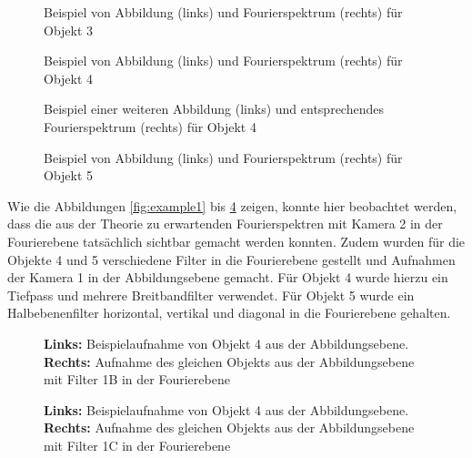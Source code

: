 \begin{figure}
	\centering
	\caption{Beispiel von Abbildung (links) und Fourierspektrum (rechts) für Objekt 3}
	\label{fig:example13}
\end{figure}

\begin{figure}
	\centering
	\caption{Beispiel von Abbildung (links) und Fourierspektrum (rechts) für Objekt 4}
	\label{fig:example4}
\end{figure}

\begin{figure}
	\centering
	\caption{Beispiel einer weiteren Abbildung (links) und entsprechendes Fourierspektrum (rechts) für Objekt 4}
	\label{fig:example9}
\end{figure}

\begin{figure}
	\centering
	\caption{Beispiel von Abbildung (links) und Fourierspektrum (rechts) für Objekt 5}
	\label{fig:example16}
\end{figure}


Wie die Abbildungen \ref{fig:example1} bis \ref{fig:example16} zeigen, konnte hier beobachtet werden, dass die aus der Theorie zu erwartenden Fourierspektren mit Kamera 2 in der Fourierebene tatsächlich sichtbar gemacht werden konnten. 
Zudem wurden für die Objekte 4 und 5 verschiedene Filter in die Fourierebene gestellt und Aufnahmen der Kamera 1 in der Abbildungsebene gemacht. Für Objekt 4 wurde hierzu ein Tiefpass und mehrere Breitbandfilter verwendet. Für Objekt 5 wurde ein Halbebenenfilter horizontal, vertikal und diagonal in die Fourierebene gehalten. \\


\begin{figure}
	\centering
	\caption{
		\textbf{Links:} Beispielaufnahme von Objekt 4 aus der Abbildungsebene.\\
		\textbf{Rechts:} Aufnahme des gleichen Objekts aus der Abbildungsebene mit Filter 1B in der Fourierebene}
	\label{fig:example10_Filter1B}
\end{figure}

\begin{figure}
	\centering
	\caption{
		\textbf{Links:} Beispielaufnahme von Objekt 4 aus der Abbildungsebene.\\
		\textbf{Rechts:} Aufnahme des gleichen Objekts aus der Abbildungsebene mit Filter 1C in der Fourierebene
	}
	\label{fig:example11_Filter1C}
\end{figure}

